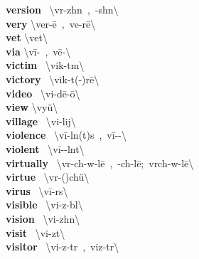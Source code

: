\documentclass[10pt,a4paper]{article}
\begin{document}
\begin{multicols}{2}
\textbf{ version }\quad \ \textbackslash \textprimstress v\textschwa r-zh\textschwa n\ ,\ -sh\textschwa n\textbackslash \\
\textbf{ very }\quad \textbackslash \textprimstress ver-\={e}\ ,\ \textprimstress ve-r\={e}\textbackslash \\
\textbf{ vet }\quad \textbackslash \textprimstress vet\textbackslash \\
\textbf{ via }\quad \textbackslash \textprimstress v\={i}-\textschwa \ ,\ \textprimstress v\={e}-\textschwa \textbackslash \\
\textbf{ victim }\quad \ \textbackslash \textprimstress vik-t\textschwa m\textbackslash \\
\textbf{ victory }\quad \ \textbackslash \textprimstress vik-t(\textschwa -)r\={e}\textbackslash \\
\textbf{ video }\quad \ \textbackslash \textprimstress vi-d\={e}-\textsecstress \={o}\textbackslash \\
\textbf{ view }\quad \textbackslash \textprimstress vy\"{u}\textbackslash \\
\textbf{ village }\quad \ \textbackslash \textprimstress vi-lij\textbackslash \\
\textbf{ violence }\quad \ \textbackslash \textprimstress v\={i}-l\textschwa n(t)s\ ,\ \textprimstress v\={i}-\textschwa -\textbackslash \\
\textbf{ violent }\quad \ \textbackslash \textprimstress v\={i}-\textschwa -l\textschwa nt\textbackslash \\
\textbf{ virtually }\quad \ \textbackslash \textprimstress v\textschwa r-ch\textschwa -w\textschwa -l\={e}\ ,\ -ch\textschwa -l\={e};\ \textprimstress v\textschwa rch-w\textschwa -l\={e}\textbackslash \\
\textbf{ virtue }\quad \ \textbackslash \textprimstress v\textschwa r-(\textsecstress )ch\"{u}\textbackslash \\
\textbf{ virus }\quad \ \textbackslash \textprimstress v\={i}-r\textschwa s\textbackslash \\
\textbf{ visible }\quad \ \textbackslash \textprimstress vi-z\textschwa -b\textschwa l\textbackslash \\
\textbf{ vision }\quad \ \textbackslash \textprimstress vi-zh\textschwa n\textbackslash \\
\textbf{ visit }\quad \ \textbackslash \textprimstress vi-z\textschwa t\textbackslash \\
\textbf{ visitor }\quad \ \textbackslash \textprimstress vi-z\textschwa -t\textschwa r\ ,\ \textprimstress viz-t\textschwa r\textbackslash \\

\end{multicols}
\end{document}
